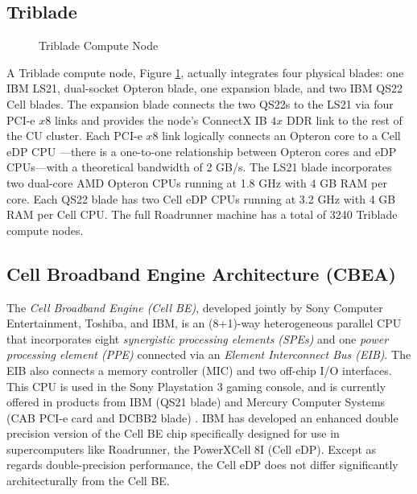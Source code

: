 \documentclass[10pt]{article}
\begin{document}
\subsection{Triblade}

\begin{figure}
    \begin{center}
    \caption{Triblade Compute Node}
    \label{fig:triblade}
    \end{center}
\end{figure}

A Triblade compute node, Figure \ref{fig:triblade}, actually
integrates four physical blades: one IBM LS21, dual-socket Opteron
blade, one expansion blade, and two IBM QS22 Cell blades.  The
expansion blade connects the two QS22s to the LS21 via four PCI-e $x8$
links and provides the node's ConnectX IB $4x$ DDR link to the rest of
the CU cluster.  Each PCI-e $x8$ link logically connects an Opteron
core to a Cell eDP CPU ---there is a one-to-one relationship between
Opteron cores and eDP CPUs---with a theoretical bandwidth of 2 GB/s.
The LS21 blade incorporates two dual-core AMD Opteron CPUs running at
1.8 GHz with 4 GB RAM per core.  Each QS22 blade has two Cell eDP CPUs
running at 3.2 GHz with 4 GB RAM per Cell CPU.  The full Roadrunner
machine has a total of 3240 Triblade compute nodes.

\subsection{Cell Broadband Engine Architecture (CBEA)}


The \emph{Cell Broadband Engine (Cell BE)}, developed jointly by Sony
Computer Entertainment, Toshiba, and IBM, is an (8+1)-way
heterogeneous parallel CPU that incorporates eight
\emph{synergistic processing elements (SPEs)} and one
\emph{power processing element (PPE)} connected via an
\emph{Element Interconnect Bus (EIB)}.  The EIB also connects
a memory controller (MIC) and two off-chip I/O interfaces.  This CPU
is used in the Sony Playstation 3 gaming console, and is currently
offered in products from IBM (QS21 blade) and Mercury Computer Systems
(CAB PCI-e card and DCBB2 blade) \cite{mercury}.  IBM has developed an
enhanced double precision version of the Cell BE chip specifically
designed for use in supercomputers like Roadrunner, the PowerXCell 8I
(Cell eDP).  Except as regards double-precision performance, the Cell
eDP does not differ significantly architecturally from the Cell BE.
\end{document}
